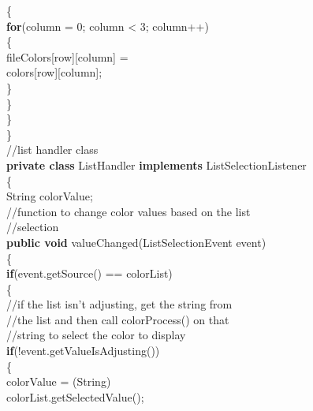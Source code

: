 \documentclass[12pt]{article}
\begin{document}
\begin{flushleft}
{\qquad \qquad \qquad \qquad \qquad				\{\\
\qquad \qquad \qquad \qquad \qquad \qquad					\textbf{for}(column = 0; column < 3; column++)\\
\qquad \qquad \qquad \qquad \qquad \qquad					\{\\
\qquad \qquad \qquad \qquad \qquad \qquad \qquad						fileColors[row][column] =\\
\qquad \qquad \qquad \qquad \qquad \qquad \qquad \qquad \qquad \qquad \qquad \qquad \qquad colors[row][column];\\
\qquad \qquad \qquad \qquad \qquad \qquad					\}\\
\qquad \qquad \qquad \qquad \qquad				\}\\
\qquad \qquad \qquad			\}\\		
\qquad \qquad		\}\\
					[2mm]
\qquad \qquad		//list handler class\\
\qquad \qquad		\textbf{private class} ListHandler \textbf{implements} ListSelectionListener\\
\qquad \qquad		\{\\
\qquad \qquad \qquad			String colorValue;\\
			[2mm]
\qquad \qquad \qquad			//function to change color values based on the list\\
\qquad \qquad \qquad//selection\\
\qquad \qquad \qquad		\textbf{public void} valueChanged(ListSelectionEvent event)\\
\qquad \qquad \qquad			\{\\
\qquad \qquad \qquad \qquad				\textbf{if}(event.getSource() == colorList)\\
\qquad \qquad \qquad \qquad				\{\\
\qquad \qquad \qquad \qquad \qquad					//if the list isn't adjusting, get the string from\\
\qquad \qquad \qquad \qquad \qquad //the list and then call colorProcess() on that\\
\qquad \qquad \qquad \qquad \qquad					//string to select the color to display\\
\qquad \qquad \qquad \qquad \qquad \textbf{if}(!event.getValueIsAdjusting())\\
\qquad \qquad \qquad \qquad \qquad		\{\\
\qquad \qquad \qquad \qquad \qquad \qquad	colorValue = (String)\\
\qquad \qquad \qquad \qquad \qquad \qquad \qquad \qquad \qquad \qquad colorList.getSelectedValue();\\   
}
\end{flushleft}
\end{document}
